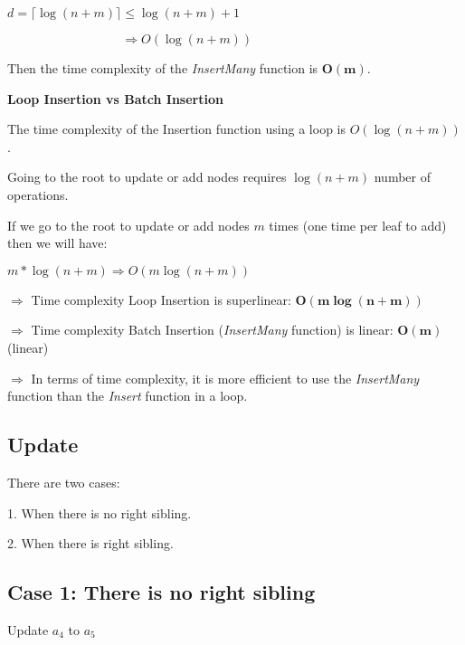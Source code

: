 \documentclass{article}
\begin{document}
$d = \lceil \log (n+m) \rceil \leq \log (n+m) + 1$



$\phantom{d = \lceil \log (n + m) \rceil} \Rightarrow O(\log (n+m))$

Then the time complexity of the \textit{InsertMany} function is $\boldsymbol{O(m)}$.



\textbf{Loop Insertion vs Batch Insertion}



The time complexity of the Insertion function using a loop is $O(\log (n+m))$.



Going to the root to update or add nodes requires $ \log (n+m)$ number of operations.

If we go to the root to update or add nodes $m$ times (one time per leaf to add) then we will have:



$m * \log (n+m) \Rightarrow \boxed{O(m \log (n+m))}$



$\Rightarrow$ Time complexity Loop Insertion is superlinear: $\boldsymbol{O(m \log (n+m))}$



$\Rightarrow$ Time complexity Batch Insertion (\textit{InsertMany} function) is linear: $\boldsymbol{O(m)}$ (linear)



$\Rightarrow$ In terms of time complexity, it is more efficient to use the \textit{InsertMany} function than the \textit{Insert} function in a loop.



\subsection{Update}

There are two cases:

1. When there is no right sibling.

2. When there is right sibling.

\subsection*{Case 1: There is no right sibling}



Update $a_4$ to $a_5$
\end{document}
